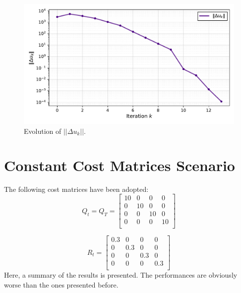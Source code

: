 \begin{figure}[htb]
    \centering
    \includegraphics[width=1\linewidth]{img/1-Task1/delta_u_norm.pdf}
    \caption{Evolution of $||\Delta u_k||$.}
    \label{fig:t1_deu}
\end{figure}

\clearpage


\newpage
\section{Constant Cost Matrices Scenario}

The following cost matrices have been adopted:
\begin{equation}
Q_t = Q_T
=
\begin{bmatrix}
    10 & 0 & 0 & 0\\
    0 & 10 & 0 & 0\\
    0 & 0 & 10 & 0\\
    0 & 0 & 0 & 10\\
\end{bmatrix}
\label{eq:CosntantQ}
\end{equation}

\begin{equation}
R_t = 
\begin{bmatrix}
    0.3 & 0 & 0 & 0\\
    0 & 0.3 & 0 & 0\\
    0 & 0 & 0.3 & 0\\
    0 & 0 & 0 & 0.3\\
\end{bmatrix}
\label{eq:ConstantR}
\end{equation}
\newline
Here, a summary of the results is presented.\newline
The performances are obviously worse than the ones presented before.


